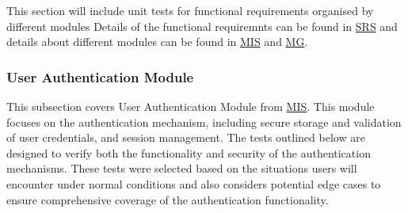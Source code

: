 \documentclass[12pt, titlepage]{article}
\begin{document}



This section will include unit tests for functional requirements organised by different modules Details of the functional requiremnts can be found in \href{https://github.com/Inreet-Kaur/capstone/blob/main/docs/SRS/SRS.pdf}{SRS} and details about different modules can be found in \href{https://github.com/PKALXI/RapidCare/blob/main/docs/Design/SoftDetailedDes/MIS.pdf}{MIS} and \href{https://github.com/PKALXI/RapidCare/blob/main/docs/Design/SoftArchitecture/MG.pdf}{MG}.

\subsubsection{User Authentication Module}

This subsection covers User Authentication Module from \href{https://github.com/PKALXI/RapidCare/blob/main/docs/Design/SoftDetailedDes/MIS.pdf}{MIS}. This module focuses on the authentication mechanism, including secure storage and validation of user credentials, and session management. The tests outlined below are designed to verify both the functionality and security of the authentication mechanisms. These tests were selected based on the situations users will encounter under normal conditions and also considers potential edge cases to ensure comprehensive coverage of the authentication functionality.
\end{document}
